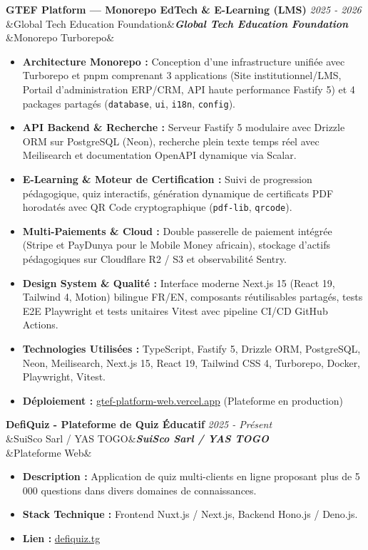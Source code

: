 \documentclass[11pt, a4paper]{article}
\newcommand{\cventry}[4]{%
  \needspace{3\baselineskip}%
  \noindent\textbf{\large #1} \hfill {\small\color{secondary}\textit{#2}}\\[2pt]%
  \ifx&#3&\else\noindent\textbf{\textit{#3}}\\[3pt]\fi
  \ifx&#4&\else\noindent{#4}\fi
  \vspace{6pt}\par
}
\begin{document}
\cventry{GTEF Platform — Monorepo EdTech \& E-Learning (LMS)}{2025 - 2026}{Global Tech Education Foundation}{Monorepo Turborepo}
\begin{itemize}
  \item \textbf{Architecture Monorepo :} Conception d'une infrastructure unifiée avec Turborepo et pnpm comprenant 3 applications (Site institutionnel/LMS, Portail d'administration ERP/CRM, API haute performance Fastify 5) et 4 packages partagés (\texttt{database}, \texttt{ui}, \texttt{i18n}, \texttt{config}).
  \item \textbf{API Backend \& Recherche :} Serveur Fastify 5 modulaire avec Drizzle ORM sur PostgreSQL (Neon), recherche plein texte temps réel avec Meilisearch et documentation OpenAPI dynamique via Scalar.
  \item \textbf{E-Learning \& Moteur de Certification :} Suivi de progression pédagogique, quiz interactifs, génération dynamique de certificats PDF horodatés avec QR Code cryptographique (\texttt{pdf-lib}, \texttt{qrcode}).
  \item \textbf{Multi-Paiements \& Cloud :} Double passerelle de paiement intégrée (Stripe et PayDunya pour le Mobile Money africain), stockage d'actifs pédagogiques sur Cloudflare R2 / S3 et observabilité Sentry.
  \item \textbf{Design System \& Qualité :} Interface moderne Next.js 15 (React 19, Tailwind 4, Motion) bilingue FR/EN, composants réutilisables partagés, tests E2E Playwright et tests unitaires Vitest avec pipeline CI/CD GitHub Actions.
  \item \textbf{Technologies Utilisées :} TypeScript, Fastify 5, Drizzle ORM, PostgreSQL, Neon, Meilisearch, Next.js 15, React 19, Tailwind CSS 4, Turborepo, Docker, Playwright, Vitest.
  \item \textbf{Déploiement :} \href{https://gtef-platform-web.vercel.app/}{gtef-platform-web.vercel.app} (Plateforme en production)
\end{itemize}

\vspace{4pt}

\cventry{DefiQuiz - Plateforme de Quiz Éducatif}{2025 - Présent}{SuiSco Sarl / YAS TOGO}{Plateforme Web}
\begin{itemize}
  \item \textbf{Description :} Application de quiz multi-clients en ligne proposant plus de 5 000 questions dans divers domaines de connaissances.
  \item \textbf{Stack Technique :} Frontend Nuxt.js / Next.js, Backend Hono.js / Deno.js.
  \item \textbf{Lien :} \href{https://defiquiz.tg/}{defiquiz.tg}
\end{itemize}
\end{document}
